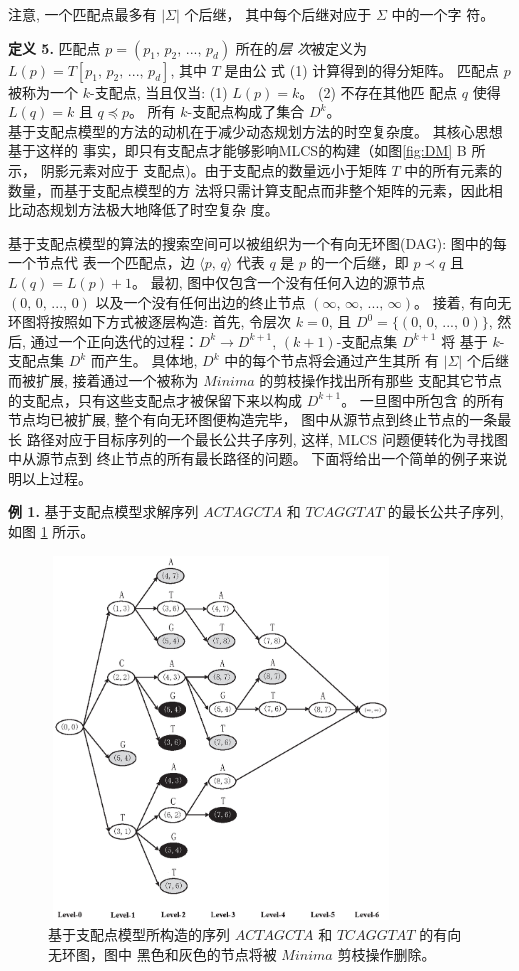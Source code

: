 注意, 一个匹配点最多有 $|\Sigma|$ 个后继， 其中每个后继对应于 $\Sigma$ 中的一个字
符。

\textbf{定义 5.} 匹配点 $p = (p_1,\, p_2,\, ...,\, p_d)$ 所在的\emph{层
  次}被定义为 $L(p) = T[p_1,\, p_2,\, ...,\, p_d]$, 其中 $T$ 是由公
式 (1) 计算得到的得分矩阵。 匹配点 $p$ 被称为一个 $k$-支配点, 当且仅当:
(1) $L(p) = k$。 (2) 不存在其他匹
配点 $q$ 使得 $L(q) = k$ 且 $q \preceq p$。 所有 $k$-支配点构成了集合 $D^k$。\\

基于支配点模型的方法的动机在于减少动态规划方法的时空复杂度。 其核心思想基于这样的
事实，即只有支配点才能够影响MLCS的构建（如图\ref{fig:DM} B 所示， 阴影元素对应于
支配点)。由于支配点的数量远小于矩阵 $T$ 中的所有元素的数量，而基于支配点模型的方
法将只需计算支配点而非整个矩阵的元素，因此相比动态规划方法极大地降低了时空复杂
度。

基于支配点模型的算法的搜索空间可以被组织为一个有向无环图(DAG): 图中的每一个节点代
表一个匹配点，边 $\langle p,\, q \rangle$ 代表 $q$ 是 $p$ 的一个后继，即 $p
\prec q$ 且 $L(q) = L(p) + 1$。 最初, 图中仅包含一个没有任何入边的源节点 $(0,\,
0,\, ...,\, 0)$ 以及一个没有任何出边的终止节点 $(\infty,\, \infty,\, ...,\,
\infty)$。 接着, 有向无环图将按照如下方式被逐层构造: 首先, 令层次 $k =
0$, 且 $D^0 = \{(0,\, 0,\, ...,\, 0)\}$, 然后,
通过一个正向迭代的过程：$D^k \rightarrow D^{k+1}$, $(k+1)$-支配点集 $D^{k+1}$ 将
基于 $k$-支配点集 $D^k$ 而产生。 具体地, $D^k$ 中的每个节点将会通过产生其所
有 $|\Sigma|$ 个后继而被扩展, 接着通过一个被称为 $Minima$ 的剪枝操作找出所有那些
支配其它节点的支配点，只有这些支配点才被保留下来以构成 $D^{k+1}$。 一旦图中所包含
的所有节点均已被扩展, 整个有向无环图便构造完毕， 图中从源节点到终止节点的一条最长
路径对应于目标序列的一个最长公共子序列, 这样, MLCS 问题便转化为寻找图中从源节点到
终止节点的所有最长路径的问题。 下面将给出一个简单的例子来说明以上过程。

\textbf{例 1.} 基于支配点模型求解序列 $ACTAGCTA$ 和 $TCAGGTAT$ 的最长公共子序列,
如图 \ref{fig:DAG} 所示。

\begin{figure}[!h]
  \centering
  \includegraphics[height=3.8in, width=3.6in]{figures/4_MLCS/DAG}
  \caption{基于支配点模型所构造的序列 $ACTAGCTA$ 和 $TCAGGTAT$ 的有向无环图，图中
    黑色和灰色的节点将被 $Minima$ 剪枝操作删除。}
  \label{fig:DAG}
\end{figure}


